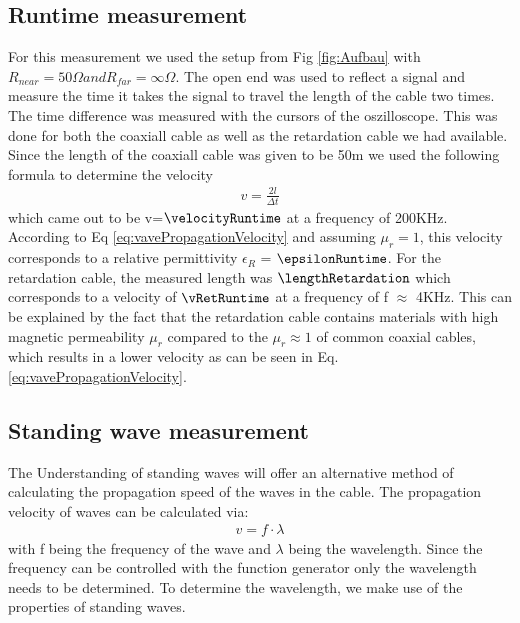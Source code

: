 \documentclass[a4paper,10pt,twocolumn]{article}
\begin{document}
    \subsection{Runtime measurement}
    For this measurement we used the setup from Fig \ref{fig:Aufbau} with $R_{near}=50\Omega and R_{far}=\infty \Omega $.
    The open end was used to reflect a signal and measure the time it takes the signal to travel the length of the cable two times.
    The time difference was measured with the cursors of the oszilloscope.
    This was done for both the coaxiall cable as well as the retardation cable we had available.
    Since the length of the  coaxiall cable was given to be 50m we used the following formula to determine the velocity
    \begin{align}
        \label{eq:runtimeVelocity}
        v=\frac{2l}{\Delta t}
        \end{align}
    which came out to be v=$\velocityRuntime$ at a frequency of 200KHz.
    According to Eq \ref{eq:vavePropagationVelocity} and assuming $\mu_r = 1$, this velocity corresponds to a relative permittivity $\epsilon_R$ = $\epsilonRuntime$.
    \endline
    For the retardation cable, the measured length was $\lengthRetardation$ which corresponds to a velocity of $\vRetRuntime$ at a frequency of f $\approx$ 4KHz.
    This can be explained by the fact that the retardation cable contains materials with high magnetic permeability $\mu_r$ compared to the $\mu_r \approx 1 $ of common coaxial cables, which results in a lower velocity as can be seen in Eq. \ref{eq:vavePropagationVelocity}.
    \subsection{Standing wave measurement}
    The Understanding of standing waves will offer an alternative method of  calculating the propagation speed of the waves in the cable.
    The propagation velocity of waves can be calculated via:
    \begin{align}
        \label{eq:velocityStanding}
        v = f\cdot\lambda
        \end{align}
    with f being the frequency of the wave and $\lambda$ being the wavelength.
    Since the frequency can be controlled with the function generator only the wavelength needs to be determined.
    To determine the wavelength, we make use of the properties of standing waves. 
\end{document}
